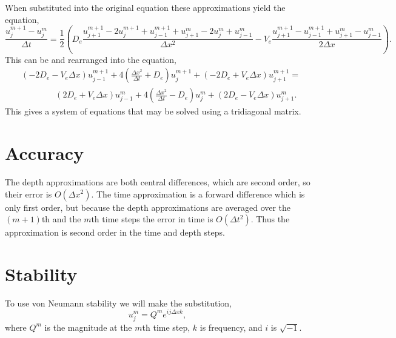 \documentclass[11pt, letterpaper]{article}
\begin{document}
When substituted into the original equation these approximations yield the equation,
\[
    \frac{u^{m + 1}_j - u^m_j}{\Delta t} = \frac{1}{2} \left(
        D_e\frac{u^{m + 1}_{j + 1} - 2u^{m + 1}_j + u^{m + 1}_{j - 1} + u^{m}_{j + 1} - 2u^{m}_j + u^{m}_{j - 1}}{\Delta x^2} -
    V_e\frac{u^{m + 1}_{j + 1} - u^{m + 1}_{j - 1} + u^{m}_{j + 1} - u^{m}_{j - 1}}{2\Delta x} \right).
\]
This can be and rearranged into the equation,
\begin{equation}
    \label{eq:iterative_solution}
    \begin{split}
        &(-2D_e - V_e\Delta x)u^{m + 1}_{j -1} + 4\left(\frac{\Delta x^2}{\Delta t} + D_e\right)u^{m + 1}_j + (-2D_e + V_e \Delta x) u^{m + 1}_{j + 1} = \\
        &\qquad\qquad (2D_e + V_e\Delta x)u^{m}_{j -1} + 4\left(\frac{\Delta x^2}{\Delta t} - D_e\right)u^{m}_j + (2D_e - V_e \Delta x) u^{m}_{j + 1}.
    \end{split}
\end{equation}
This gives a system of equations that may be solved using a tridiagonal matrix.

\section*{Accuracy}

The depth approximations are both central differences, which are second order, so their error is $O(\Delta x^2)$.
The time approximation is a forward difference which is only first order, but because the depth approximations are averaged over the $(m + 1)$th and the $m$th time steps the error in time is $O(\Delta t^2)$.
Thus the approximation is second order in the time and depth steps.


\section*{Stability}

To use von Neumann stability we will make the substitution,
\[
    u^m_j = Q^me^{ij\Delta x k},
\]
where $Q^m$ is the magnitude at the $m$th time step, $k$ is frequency, and $i$ is $\sqrt{-1}$.
\end{document}
